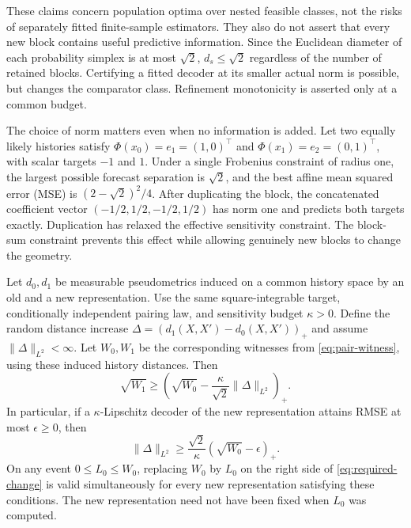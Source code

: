 These claims concern population optima over nested feasible classes, not
the risks of separately fitted finite-sample estimators. They also do not
assert that every new block contains useful predictive information.
Since the Euclidean diameter of each probability simplex is at most $\sqrt2$,
$d_s\leq\sqrt2$ regardless of the number of retained blocks. Certifying a
fitted decoder at its smaller actual norm is possible, but changes the
comparator class. Refinement monotonicity is asserted only at a common
budget.

The choice of norm matters even when no information is added. Let two
equally likely histories satisfy $\Phi(x_0)=e_1=(1,0)^\top$ and
$\Phi(x_1)=e_2=(0,1)^\top$, with scalar targets $-1$ and $1$. Under a
single Frobenius constraint of radius one, the largest possible forecast
separation is $\sqrt2$, and the best affine mean squared error (MSE) is
$(2-\sqrt2)^2/4$. After duplicating the block, the concatenated coefficient
vector $(-1/2,1/2,-1/2,1/2)$ has norm one and predicts both targets exactly.
Duplication has relaxed the effective sensitivity constraint. The
block-sum constraint prevents this effect while allowing genuinely new
blocks to change the geometry.

\begin{theorem}
\label{thm:necessary-expansion}
Let $d_0,d_1$ be measurable pseudometrics induced on a common history space by an
old and a new representation. Use the same square-integrable target,
conditionally independent pairing law, and sensitivity budget $\kappa>0$.
Define the random distance increase
$\Delta=(d_1(X,X')-d_0(X,X'))_+$ and assume
$\|\Delta\|_{L^2}<\infty$. Let $W_0,W_1$ be the corresponding witnesses
from \eqref{eq:pair-witness}, using these induced history distances. Then
\begin{equation}
 \sqrt{W_1}\geq
 \left(\sqrt{W_0}-\frac{\kappa}{\sqrt2}
                       \|\Delta\|_{L^2}\right)_+.
 \label{eq:metric-change}
\end{equation}
In particular, if a $\kappa$-Lipschitz decoder of the new representation
attains RMSE at most $\epsilon\geq0$, then
\begin{equation}
 \|\Delta\|_{L^2}\geq
       \frac{\sqrt2}{\kappa}(\sqrt{W_0}-\epsilon)_+.
 \label{eq:required-change}
\end{equation}
On any event $0\leq L_0\leq W_0$, replacing $W_0$ by $L_0$ on the
right side of \eqref{eq:required-change} is valid simultaneously for every
new representation satisfying these conditions. The new representation
need not have been fixed when $L_0$ was computed.
\end{theorem}

